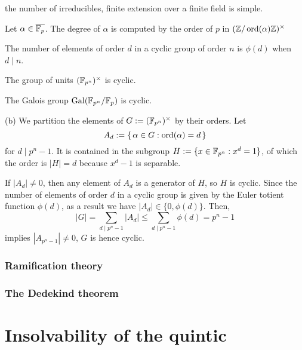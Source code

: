 \documentclass{../note}
\begin{document}
\begin{prb}
the number of irreducibles, finite extension over a finite field is simple.
\end{prb}

\begin{prb}
Let $\alpha\in\overline{\mathbb{F}_p}$.
The degree of $\alpha$ is computed by the order of $p$ in $(\mathbb{Z}/\operatorname{ord}(\alpha)\mathbb{Z})^\times$
\end{prb}

\begin{prb}

\begin{parts}
\item The number of elements of order $d$ in a cyclic group of order $n$ is $\phi(d)$ when $d\mid n$.
\item The group of units $(\mathbb{F}_{p^n})^\times$ is cyclic.
\item The Galois group $\operatorname{Gal}(\mathbb{F}_{p^n}/\mathbb{F}_p)$ is cyclic.
\end{parts}
\end{prb}
\begin{pf}
(b)
We partition the elements of $G:=(\mathbb{F}_{p^n})^\times$ by their orders.
Let
\[A_d:=\{\,\alpha\in G:\operatorname{ord}(\alpha)=d\,\}\]
for $d\mid p^n-1$.
It is contained in the subgroup $H:=\{x\in\mathbb{F}_{p^n}:x^d=1\}$, of which the order is $|H|=d$ because $x^d-1$ is separable.

If $|A_d|\ne0$, then any element of $A_d$ is a generator of $H$, so $H$ is cyclic.
Since the number of elements of order $d$ in a cyclic group is given by the Euler totient function $\phi(d)$, as a result we have $|A_d|\in\{0,\phi(d)\}$.
Then,
\[|G|=\sum_{d\mid p^n-1}|A_d|\le\sum_{d\mid p^n-1}\phi(d)=p^n-1\]
implies $|A_{p^n-1}|\ne0$, $G$ is hence cyclic.
\end{pf}

\section{Ramification theory}

\section{The Dedekind theorem}






\part{Insolvability of the quintic}
\end{document}
